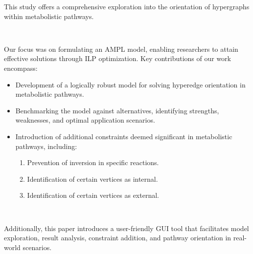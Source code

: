 This study offers a comprehensive exploration into the orientation of hypergraphs within metabolistic pathways.

~


Our focus was on formulating an AMPL model, enabling researchers to attain effective solutions through ILP optimization. Key contributions of our work encompass:

\begin{itemize}
\item Development of a logically robust model for solving hyperedge orientation in metabolistic pathways.
\item Benchmarking the model against alternatives, identifying strengths, weaknesses, and optimal application scenarios.
\item Introduction of additional constraints deemed significant in metabolistic pathways, including:
\begin{enumerate}[left=2em]
\item Prevention of inversion in specific reactions.
\item Identification of certain vertices as internal.
\item Identification of certain vertices as external.
\end{enumerate}
\end{itemize}

~

Additionally, this paper introduces a user-friendly GUI tool that facilitates model exploration, result analysis, constraint addition, and pathway orientation in real-world scenarios.
